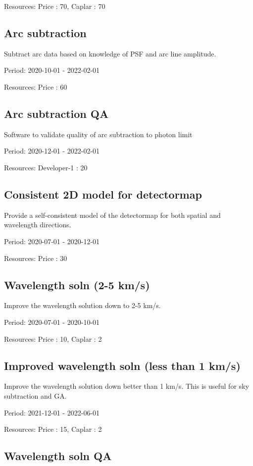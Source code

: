 Resources: Price : 70, Caplar : 70

\subsection{Arc subtraction}

Subtract arc data based on knowledge of PSF and arc line amplitude.

Period: 2020-10-01 - 2022-02-01

Resources: Price : 60

\subsection{Arc subtraction QA}

Software to validate quality of arc subtraction to photon limit

Period: 2020-12-01 - 2022-02-01

Resources: Developer-1 : 20

\subsection{Consistent 2D model for detectormap}

Provide a self-consistent model of the detectormap for both spatial and wavelength directions.

Period: 2020-07-01 - 2020-12-01

Resources: Price : 30

\subsection{Wavelength soln (2-5 km/s)}

Improve the wavelength solution down to 2-5 km/s.

Period: 2020-07-01 - 2020-10-01

Resources: Price : 10, Caplar : 2

\subsection{Improved wavelength soln (less than 1 km/s)}

Improve the wavelength solution down better than 1 km/s. This is useful for sky subtraction and GA.

Period: 2021-12-01 - 2022-06-01

Resources: Price : 15, Caplar : 2

\subsection{Wavelength soln QA}

